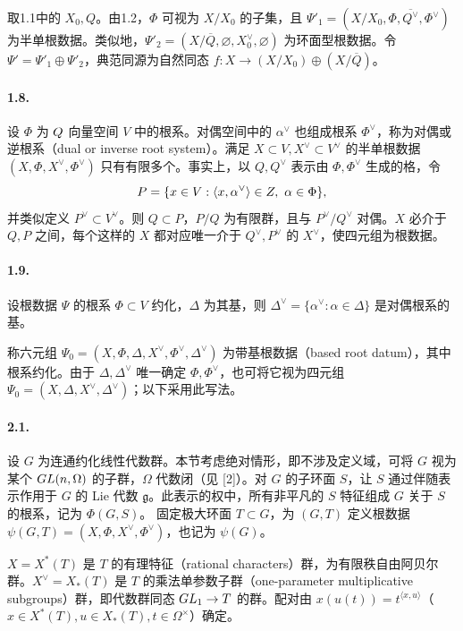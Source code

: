 取1.1中的 $X_0,Q$。由1.2，$\Phi$ 可视为 $X/X_0$ 的子集，且 $\Psi'_1=(X/X_0,\Phi,\overline{Q^\vee},\Phi^\vee)$ 为半单根数据。类似地，$\Psi'_2=(X/\overline Q,\varnothing,X_0^\vee,\varnothing)$ 为环面型根数据。令 $\Psi'=\Psi'_1\oplus\Psi'_2$，典范同源为自然同态 $f:X\to(X/X_0)\oplus(X/\overline Q)$。
\paragraph*{1.8.} 设 $\Phi$ 为 $Q$ 向量空间 $V$ 中的根系。对偶空间中的 $\alpha^\vee$ 也组成根系 $\Phi^\vee$，称为对偶或逆根系（dual or inverse root system）。满足 $X\subset V,X^\vee\subset V^\vee$ 的半单根数据 $(X,\Phi,X^\vee,\Phi^\vee)$ 只有有限多个。事实上，以 $Q,Q^\vee$ 表示由 $\Phi,\Phi^\vee$ 生成的格，令
\[
 P=\{x\in V:\langle x,\alpha^\vee\rangle\in Z,\ \alpha\in\Phi\},
\]
并类似定义 $P^\vee\subset V^\vee$。则 $Q\subset P$，$P/Q$ 为有限群，且与 $P^\vee/Q^\vee$ 对偶。$X$ 必介于 $Q,P$ 之间，每个这样的 $X$ 都对应唯一介于 $Q^\vee,P^\vee$ 的 $X^\vee$，使四元组为根数据。
\paragraph*{1.9.} 设根数据 $\Psi$ 的根系 $\Phi\subset V$ 约化，$\Delta$ 为其基，则 $\Delta^\vee=\{\alpha^\vee:\alpha\in\Delta\}$ 是对偶根系的基。

称六元组 $\Psi_0=(X,\Phi,\Delta,X^\vee,\Phi^\vee,\Delta^\vee)$ 为带基根数据（based root datum），其中根系约化。由于 $\Delta,\Delta^\vee$ 唯一确定 $\Phi,\Phi^\vee$，也可将它视为四元组 $\Psi_0=(X,\Delta,X^\vee,\Delta^\vee)$；以下采用此写法。

\paragraph*{2.1.} 设 $G$ 为连通约化线性代数群。本节考虑绝对情形，即不涉及定义域，可将 $G$ 视为某个 $GL(n,\Omega)$ 的子群，$\Omega$ 代数闭（见 [2]）。对 $G$ 的子环面 $S$，让 $S$ 通过伴随表示作用于 $G$ 的 Lie 代数 $\mathfrak g$。此表示的权中，所有非平凡的 $S$ 特征组成 $G$ 关于 $S$ 的根系，记为 $\Phi(G,S)$。
固定极大环面 $T\subset G$，为 $(G,T)$ 定义根数据 $\psi(G,T)=(X,\Phi,X^\vee,\Phi^\vee)$，也记为 $\psi(G)$。

$X=X^*(T)$ 是 $T$ 的有理特征（rational characters）群，为有限秩自由阿贝尔群。$X^\vee=X_*(T)$ 是 $T$ 的乘法单参数子群（one-parameter multiplicative subgroups）群，即代数群同态 $GL_1\to T$ 的群。配对由 $x(u(t))=t^{\langle x,u\rangle}$（$x\in X^*(T),u\in X_*(T),t\in\Omega^\times$）确定。

